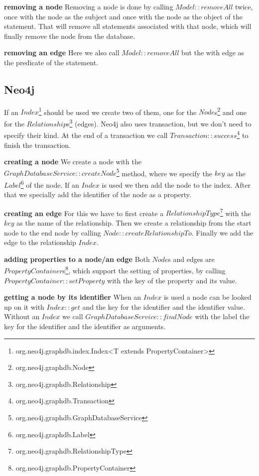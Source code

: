 \textbf{removing a node} \newline
Removing a node is done by calling $ Model::removeAll $ twice,
once with the node as the subject and once with the node as the object of the statement.
That will remove all statements associated with that node,
which will finally remove the node from the database.

\textbf{removing an edge} \newline
Here we also call $ Model::removeAll $ but the with edge as the predicate of the statement.

\subsection{Neo4j}
If an $ Index $\footnote{org.neo4j.graphdb.index.Index<T extends PropertyContainer>} should be used we create two of them,
one for the $ Node $s\footnote{org.neo4j.graphdb.Node} and one for the $ Relationship $s\footnote{org.neo4j.graphdb.Relationship} (edges).
Neo4j also uses transaction,
but we don't need to specify their kind.
At the end of a transaction we call $ Transaction::success $\footnote{org.neo4j.graphdb.Transaction} to finish the transaction.

\textbf{creating a node} \newline
We create a node with the $ GraphDatabaseService::createNode $\footnote{org.neo4j.graphdb.GraphDatabaseService} method,
where we specify the $ key $ as the $ Label $\footnote{org.neo4j.graphdb.Label} of the node.
If an $ Index $ is used we then add the node to the index.
After that we specially add the identifier of the node as a property.

\textbf{creating an edge} \newline
For this we have to first create a $ RelationshipType $\footnote{org.neo4j.graphdb.RelationshipType} with the $ key $ as the name of the relationship.
Then we create a relationship from the start node to the end node by calling $ Node::createRelationshipTo $.
Finally we add the edge to the relationship $ Index $.

\textbf{adding properties to a node/an edge} \newline
Both $ Node $s and edges are $ PropertyContainer $s\footnote{org.neo4j.graphdb.PropertyContainer},
which support the setting of properties,
by calling $ PropertyContainer::setProperty $ with the key of the property and its value.

\textbf{getting a node by its identifier} \newline
When an $ Index $ is used a node can be looked up on it with $ Index::get $ and the key for the identifier and the identifier value.
Without an $ Index $ we call $ GraphDatabaseService::findNode $ with the label the key for the identifier and the identifier as arguments.

